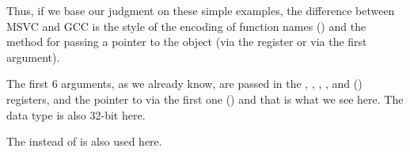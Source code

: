 Thus, if we base our judgment on these simple examples, the difference between MSVC and GCC
is the style of the encoding of function names () and the method for passing a pointer to the object
(via the \ECX register or via the first argument).


The first 6 arguments, as we already know, are passed in the \RDI, \RSI, \RDX, \RCX,  and 
 (\SysVABI) registers,
and the pointer to \ITthis via the first one (\RDI) and that is what we see here.
The \Tint data type is also 32-bit here.

The \JMP instead of \RET {} is also used here.



